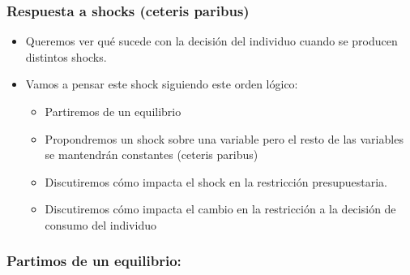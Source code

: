 \documentclass{beamer}
\begin{document}
\begin{frame}
\frametitle{Respuesta a shocks (ceteris paribus)}
\begin{itemize}
    \item Queremos ver qué sucede con la decisión del individuo cuando se producen distintos shocks. \vspace{2mm}
    \item Vamos a pensar este shock siguiendo este orden lógico:
    \begin{itemize}
        \item Partiremos de un equilibrio
        \item Propondremos un shock sobre una variable pero el resto de las variables se mantendrán constantes (ceteris paribus)
        \item Discutiremos cómo impacta el shock en la restricción presupuestaria.      
        \item Discutiremos cómo impacta el cambio en la restricción a la decisión de consumo del individuo
    \end{itemize}
\end{itemize} 
\end{frame}

\begin{frame}
\frametitle{Partimos de un equilibrio:}
\begin{center}
\begin{figure}[H]
\renewcommand{\figurename}{Figure}
\begin{center}
\end{center}
\end{figure}
\end{center}
\end{frame}
\end{document}
